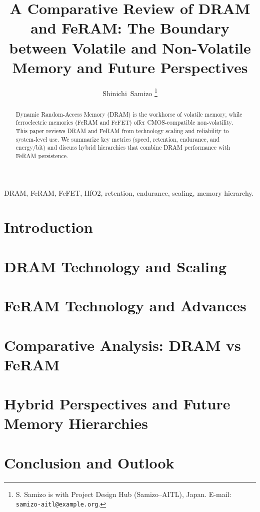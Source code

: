 \documentclass[journal]{IEEEtran}
\title{A Comparative Review of DRAM and FeRAM: The Boundary between Volatile and Non-Volatile Memory and Future Perspectives}
\author{Shinichi~Samizo%
\thanks{S. Samizo is with Project Design Hub (Samizo--AITL), Japan. E-mail: \texttt{samizo-aitl@example.org}.}
}
\begin{document}
\maketitle

\begin{abstract}
Dynamic Random-Access Memory (DRAM) is the workhorse of volatile memory, while ferroelectric memories (FeRAM and FeFET) offer CMOS-compatible non-volatility. This paper reviews DRAM and FeRAM from technology scaling and reliability to system-level use. We summarize key metrics (speed, retention, endurance, and energy/bit) and discuss hybrid hierarchies that combine DRAM performance with FeRAM persistence.
\end{abstract}

\begin{IEEEkeywords}
DRAM, FeRAM, FeFET, HfO2, retention, endurance, scaling, memory hierarchy.
\end{IEEEkeywords}

\section{Introduction}


\section{DRAM Technology and Scaling}


\section{FeRAM Technology and Advances}


\section{Comparative Analysis: DRAM vs FeRAM}
\label{sec:comparison}


\section{Hybrid Perspectives and Future Memory Hierarchies}


\section{Conclusion and Outlook}




\end{document}
